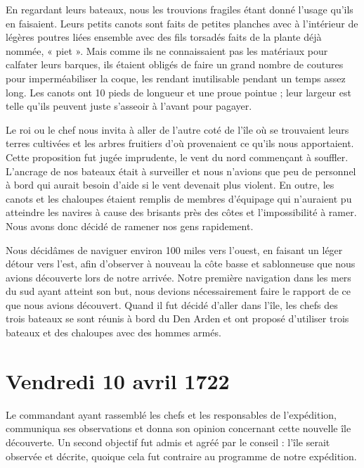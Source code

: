 \documentclass{article}
\begin{document}
        
    En regardant leurs bateaux, nous les trouvions fragiles étant donné l'usage qu'ils en faisaient. Leurs petits canots sont faits de petites planches avec à l'intérieur de légères poutres liées ensemble avec des fils torsadés faits de la plante déjà nommée, « piet ». Mais comme ils ne connaissaient pas les matériaux pour calfater leurs barques, ils étaient obligés de faire un grand nombre de coutures pour imperméabiliser la coque, les rendant inutilisable pendant un temps assez long. Les canots ont 10 pieds de longueur et une proue pointue ; leur largeur est telle qu'ils peuvent juste s'asseoir à l'avant pour pagayer.
            
        
    Le roi ou le chef nous invita à aller de l'autre coté de l'île où se trouvaient leurs terres cultivées et les arbres fruitiers d'où provenaient ce qu'ils nous apportaient. Cette proposition fut jugée imprudente, le vent du nord commençant à souffler. L'ancrage de nos bateaux était à surveiller et nous n'avions que peu de personnel à bord qui aurait besoin d'aide si le vent devenait plus violent. En outre, les canots et les chaloupes étaient remplis de membres d'équipage qui n'auraient pu atteindre les navires à cause des brisants près des côtes et l'impossibilité à ramer. Nous avons donc décidé de ramener nos gens rapidement.
            
        
    Nous décidâmes de naviguer environ 100 miles vers l'ouest, en faisant un léger détour vers l'est, afin d'observer à nouveau la côte basse et sablonneuse que nous avions découverte lors de notre arrivée. Notre première navigation dans les mers du sud ayant atteint son but, nous devions nécessairement faire le rapport de ce que nous avions découvert. Quand il fut décidé d'aller dans l'île, les chefs des trois bateaux se sont réunis à bord du Den Arden et ont proposé d'utiliser trois bateaux et des chaloupes avec des hommes armés.
         
         
            
        \section{Vendredi 10 avril 1722}
    
            
        
    Le commandant ayant rassemblé les chefs et les responsables de l'expédition, communiqua ses observations et donna son opinion concernant cette nouvelle île découverte. Un second objectif fut admis et agréé par le conseil : l'île serait observée et décrite, quoique cela fut contraire au programme de notre expédition.
            
\end{document}
